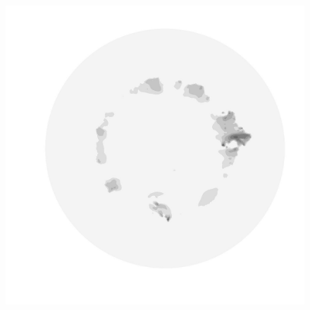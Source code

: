\begin{figure}
\begin{minipage}[b]{0.30\linewidth}
  \end{minipage}
  \quad
  \begin{minipage}[b]{0.30\linewidth}
    \includegraphics[width=1.0\textwidth]{images/EISMINT_II/U/U_mag_2000.jpg}
  \end{minipage}
  

\end{figure}
